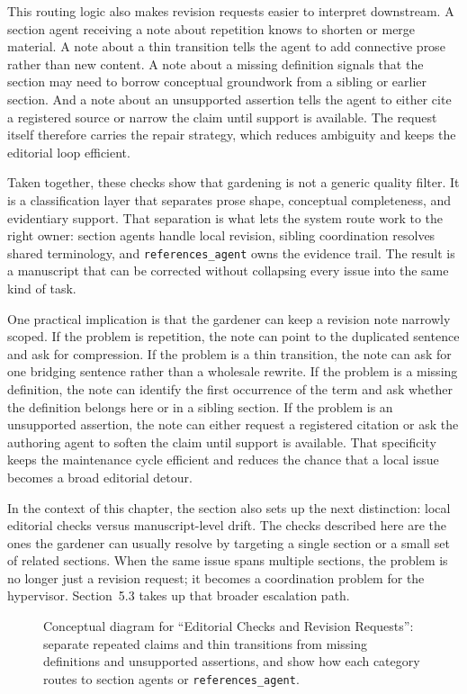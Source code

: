\documentclass[11pt]{article}
\begin{document}
This routing logic also makes revision requests easier to interpret downstream. A section agent receiving a note about repetition knows to shorten or merge material. A note about a thin transition tells the agent to add connective prose rather than new content. A note about a missing definition signals that the section may need to borrow conceptual groundwork from a sibling or earlier section. And a note about an unsupported assertion tells the agent to either cite a registered source or narrow the claim until support is available. The request itself therefore carries the repair strategy, which reduces ambiguity and keeps the editorial loop efficient.

Taken together, these checks show that gardening is not a generic quality filter. It is a classification layer that separates prose shape, conceptual completeness, and evidentiary support. That separation is what lets the system route work to the right owner: section agents handle local revision, sibling coordination resolves shared terminology, and \texttt{references\_agent} owns the evidence trail. The result is a manuscript that can be corrected without collapsing every issue into the same kind of task.

One practical implication is that the gardener can keep a revision note narrowly scoped. If the problem is repetition, the note can point to the duplicated sentence and ask for compression. If the problem is a thin transition, the note can ask for one bridging sentence rather than a wholesale rewrite. If the problem is a missing definition, the note can identify the first occurrence of the term and ask whether the definition belongs here or in a sibling section. If the problem is an unsupported assertion, the note can either request a registered citation or ask the authoring agent to soften the claim until support is available. That specificity keeps the maintenance cycle efficient and reduces the chance that a local issue becomes a broad editorial detour.

In the context of this chapter, the section also sets up the next distinction: local editorial checks versus manuscript-level drift. The checks described here are the ones the gardener can usually resolve by targeting a single section or a small set of related sections. When the same issue spans multiple sections, the problem is no longer just a revision request; it becomes a coordination problem for the hypervisor. Section~5.3 takes up that broader escalation path.

\begin{figure}[htbp]
\centering

\caption{Conceptual diagram for ``Editorial Checks and Revision Requests'': separate repeated claims and thin transitions from missing definitions and unsupported assertions, and show how each category routes to section agents or \texttt{references\_agent}.}
\end{figure}
\end{document}
